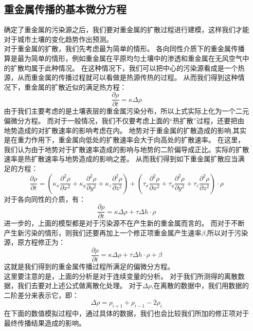 \documentclass[a4paper]{article}
\begin{document}
\subsection{重金属传播的基本微分方程}
确定了重金属的污染源之后，我们要对重金属的扩散过程进行建模，这样我们才能对于城市土壤的变化趋势作出预测。  \\
\indent 对于重金属的扩散，我们先考虑最为简单的情形。
各向同性介质下的重金属传播算是最为简单的情形，例如重金属在平原均匀土壤中的渗透和重金属在无风空气中的扩散均属于此种情况。
在这种情况下，我们可以把中心的污染源看成是一个热源，从而重金属的传播过程就可以看做是热源传热的过程。
从而我们得到这种情况下，重金属的扩散近似的满足热方程：
\begin{equation}
\frac{\partial \rho}{\partial t} = \kappa \Delta \rho
\end{equation}
由于我们主要考虑的是土壤表层的重金属污染分布，所以上式实际上化为一个二元偏微分方程。
\indent 而对于一般情况，我们不仅要考虑上面的“热扩散”过程，还要把由地势造成的对扩散速率的影响考虑在内。
地势对于重金属的扩散造成的影响,其实是在重力作用下，重金属向低处的扩散速率会大于向高处的扩散速率。
在这里，我们认为由于地势对于扩散速率造成的影响与地势的二阶偏导成正比。实际的扩散速率是热扩散速率与地势造成的影响之差。
从而我们得到如下重金属扩散应当满足的方程：
\begin{equation}
\frac{\partial \rho}{\partial t} 
= (\kappa_x\frac{\partial^2 \rho}{\partial x^2}+\kappa_y\frac{\partial^2 \rho}{\partial y^2}+\kappa_z\frac{\partial^2 \rho}{\partial z^2})
+( \tau_x\frac{\partial^2 \rho}{\partial x^2}+\tau_y\frac{\partial^2 \rho}{\partial y^2}+\tau_z\frac{\partial^2 \rho}{\partial z^2})\cdot\rho
\end{equation}
 对于各向同性的介质，有：
\begin{equation}
\frac{\partial \rho}{\partial t} = \kappa \Delta \rho + \tau \Delta h \cdot\rho
\end{equation}
\indent 进一步的，上面的模型都是对于污染源不在产生新的重金属而言的。
而对于不断产生新污染的情形，则我们还要再加上一个修正项重金属产生速率$\beta$,所以对于污染源，原方程修正为：
\begin{equation}
\label{eqn_model}
\frac{\partial \rho}{\partial t} = \kappa \Delta \rho + \tau \Delta h \cdot\rho + \beta
\end{equation}
这就是我们得到的重金属传播过程所满足的偏微分方程。  \\
\indent 这里要注意的是，上面的分析是对于连续变量的分析。
对于我们所测得的离散数据，我们去要对上述公式做离散化处理。
对于$\Delta \rho $,在离散的数据中，我们用数据的二阶差分来表示它，即：
\begin{equation}
\Delta \rho= \rho_{i+1}+\rho_{i-1}-2\rho_i
\end{equation}
在下面的数值模拟过程中，通过具体的数据，我们也会比较我们所加的修正项对于最终传播结果造成的影响。
\end{document}
